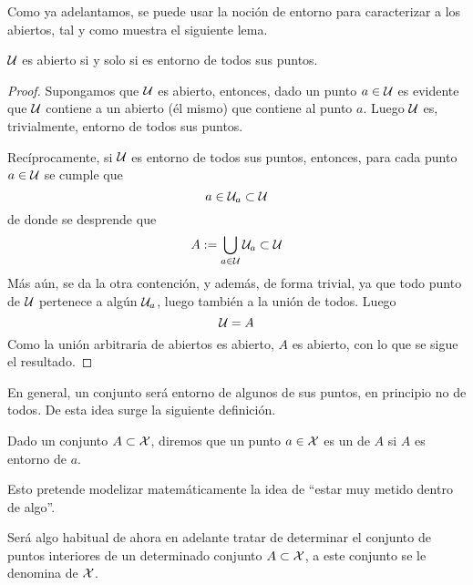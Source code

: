 Como ya adelantamos, se puede usar la noción de entorno para caracterizar a los abiertos, tal y como muestra el siguiente lema.
\begin{lem}
	\label{etop_lem_caracterizacionAbiertos}
	$\mathcal{U}$ es abierto si y solo si es entorno de todos sus puntos.
\end{lem}
\begin{proof}
	Supongamos que $\mathcal{U}$ es abierto, entonces, dado un punto $a\in\mathcal{U}$ es evidente que $\mathcal{U}$ contiene a un abierto (él mismo) que contiene al punto $a$. Luego $\mathcal{U}$ es, trivialmente, entorno de todos sus puntos.
	
	Recíprocamente, si $\mathcal{U}$ es entorno de todos sus puntos, entonces, para cada punto $a\in\mathcal{U}$ se cumple que
	\begin{equation*}
	a\in\mathcal{U}_a\subset\mathcal{U}
	\end{equation*}
	de donde se desprende que
	\begin{equation*}
	A:=\bigcup_{a\in\mathcal{U}}\mathcal{U}_a\subset\mathcal{U}
	\end{equation*}
	Más aún, se da la otra contención, y además, de forma trivial, ya que todo punto de $\mathcal{U}$ pertenece a algún $\mathcal{U}_a$, luego también a la unión de todos. Luego
	\begin{equation*}
	\mathcal{U}=A
	\end{equation*}
	Como la unión arbitraria de abiertos es abierto, $A$ es abierto, con lo que se sigue el resultado.
\end{proof}
En general, un conjunto será entorno de algunos de sus puntos, en principio no de todos. De esta idea surge la siguiente definición.
\begin{defi}
	\label{etop_def_puntoInterior}
	Dado un conjunto $A\subset\mathcal{X}$, diremos que un punto $a\in\mathcal{X}$ es un  de $A$ si $A$ es entorno de $a$.
\end{defi}

Esto pretende modelizar matemáticamente la idea de ``estar muy metido dentro de algo''.

Será algo habitual de ahora en adelante tratar de determinar el conjunto de puntos interiores de un determinado conjunto $A\subset\mathcal{X}$, a este conjunto se le denomina  de $\mathcal{X}$.

